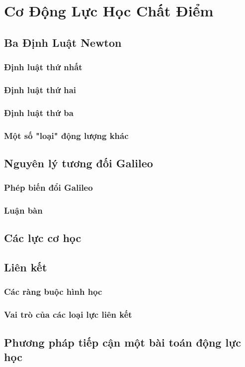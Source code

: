   
\chapter{Cơ Động Lực Học Chất Điểm}

\section{Ba Định Luật Newton}
\subsection{Định luật thứ nhất}
\subsection{Định luật thứ hai}
\subsection{Định luật thứ ba}
\subsection{Một số "loại" động lượng khác}

\section{Nguyên lý tương đối Galileo}
\subsection{Phép biến đổi Galileo}
\subsection{Luận bàn}

\section{Các lực cơ học}

\section{Liên kết}
\subsection{Các ràng buộc hình học}
\subsection{Vai trò của các loại lực liên kết}

\section{Phương pháp tiếp cận một bài toán động lực học}
